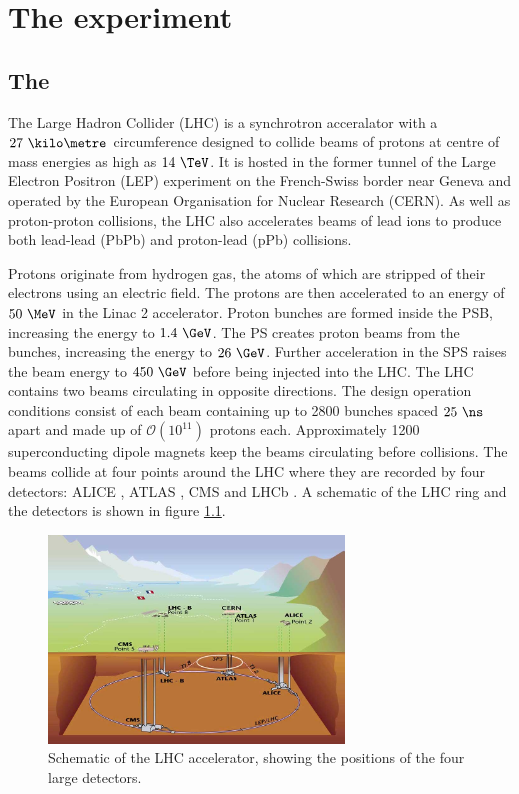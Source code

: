 \chapter{The \CMS experiment}
\label{chap:detector}

\section{The \LHC}
\label{sec:theLHC}

The Large Hadron Collider (LHC) \cite{theLHC} is a synchrotron acceralator
with a $27~\kilo\metre$ circumference designed to
collide beams of protons at centre of mass energies as high as $14~\TeV$. It is
hosted in the former tunnel of the Large Electron Positron (LEP) \cite{LEP:1983aa} experiment on the French-Swiss border
near Geneva and operated by the European Organisation for Nuclear Research
(CERN). As well as proton-proton collisions, the LHC also accelerates beams of
lead ions to produce both lead-lead (PbPb) and proton-lead (pPb) collisions.

Protons originate from hydrogen gas, the atoms of which are stripped of
their electrons using an electric field. The protons are then accelerated to an
energy of $50~\MeV$ in the Linac 2 accelerator. Proton bunches are formed inside
the \ac{PSB}, increasing the energy to $1.4~\GeV$. The \ac{PS} creates proton
beams from the bunches, increasing the energy to $26~\GeV$. Further acceleration
in the \ac{SPS} raises the beam energy to $450~\GeV$ before being injected into
the LHC. The LHC contains two beams circulating in opposite directions. The
design operation conditions consist of each beam containing up to 2800 bunches
spaced $25~\ns$ apart and made up of $\mathcal{O}(10^{11})$ protons each. 
Approximately 1200 superconducting dipole magnets keep the beams circulating
before collisions. The beams collide at four points around the LHC where they
are recorded by four detectors: ALICE \cite{Aamodt:2008zz}, ATLAS
\cite{Aad:2008zzm}, CMS \cite{Chatrchyan:2008aa} and LHCb \cite{Alves:2008zz}. A
schematic of the LHC ring and the detectors is shown in figure
\ref{fig:LHCschematic}.

\begin{figure}[htbp]
   \includegraphics[width=0.7\textwidth]{plots/detector/LHC_layout_sch.jpg}
\caption{Schematic of the LHC accelerator, showing the positions of the four
large detectors.}
\label{fig:LHCschematic}
\end{figure}

